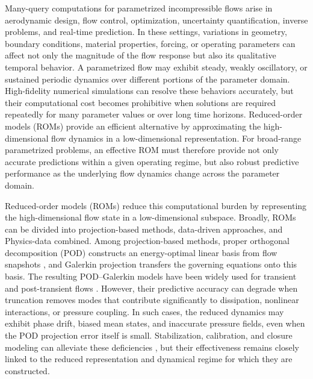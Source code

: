 

Many-query computations for parametrized incompressible flows arise in
aerodynamic design, flow control, optimization, uncertainty quantification,
inverse problems, and real-time prediction. In these settings, variations in
geometry, boundary conditions, material properties, forcing, or operating
parameters can affect not only the magnitude of the flow response but also
its qualitative temporal behavior. A parametrized flow may exhibit steady,
weakly oscillatory, or sustained periodic dynamics over different portions
of the parameter domain. High-fidelity numerical simulations can resolve
these behaviors accurately, but their computational cost becomes prohibitive
when solutions are required repeatedly for many parameter values or over long
time horizons. Reduced-order models (ROMs) provide an efficient alternative
by approximating the high-dimensional flow dynamics in a low-dimensional
representation. For broad-range parametrized problems, an effective ROM must
therefore provide not only accurate predictions within a given operating
regime, but also robust predictive performance as the underlying flow
dynamics change across the parameter domain.

Reduced-order models (ROMs) reduce this computational burden by representing the high-dimensional flow state in a low-dimensional subspace\cite{benner2015,hesthaven2016,quarteroni2016}. Broadly, ROMs can be divided into projection-based methods, data-driven approaches, and Physics-data combined. Among projection-based methods, proper orthogonal decomposition (POD) constructs an energy-optimal linear basis from flow snapshots \cite{sirovich1987,berkooz1993}, and Galerkin projection transfers the governing equations onto this basis. The resulting POD–Galerkin models have been widely used for transient and post-transient flows \cite{noack2003,rowley2004,roz2007}. However, their predictive accuracy can degrade when truncation removes modes that contribute significantly to dissipation, nonlinear interactions, or pressure coupling. In such cases, the reduced dynamics may exhibit phase drift, biased mean states, and inaccurate pressure fields, even when the POD projection error itself is small. Stabilization, calibration, and closure modeling can alleviate these
deficiencies \cite{amsallem2012}, but their effectiveness remains closely
linked to the reduced representation and dynamical regime for which they are
constructed.

